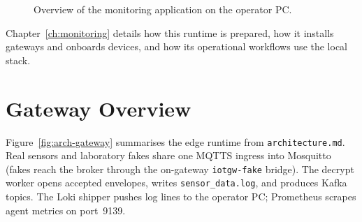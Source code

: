 \documentclass[12pt,a4paper]{report}
\begin{document}
\begin{figure}[htbp]
{%
}
\caption{Overview of the monitoring application on the
operator PC.}
\label{fig:arch-monitoring}
\end{figure}

Chapter~\ref{ch:monitoring} details how this runtime is
prepared, how it installs gateways and onboards devices,
and how its operational workflows use the local stack.

\section{Gateway Overview}
\label{sec:arch-gateway-overview}

Figure~\ref{fig:arch-gateway} summarises the edge
runtime from \texttt{architecture.md}. Real sensors and
laboratory fakes share one MQTTS ingress into Mosquitto
(fakes reach the broker through the on-gateway
\texttt{iotgw-fake} bridge). The decrypt worker opens
accepted envelopes, writes \texttt{sensor\_data.log}, and
produces Kafka topics. The Loki shipper pushes log lines
to the operator PC; Prometheus scrapes agent metrics on
port~9139.
\end{document}

